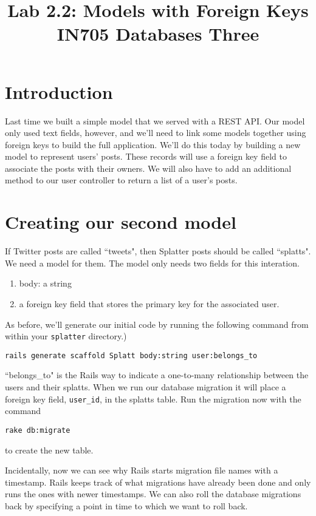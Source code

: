 \documentclass{article}
\begin{document}
\title{Lab 2.2: Models with Foreign Keys\\ IN705 Databases Three}
\date{}
\maketitle

\section*{Introduction}
Last time we built a simple model that we served with a REST API.  Our model only used text fields, however, and we'll need to link some models together using foreign keys to build the full application.  We'll do this today by building a new model to represent users' posts.  These records will use a foreign key field to associate the posts with their owners.  We will also have to add an additional method to our user controller to return a list of a user's posts.

\section{Creating our second model}
If Twitter posts are called ``tweets", then Splatter posts should be called ``splatts".  We need a model for them. The model only needs two fields for this interation.

\begin{enumerate}
  \item  body:  a string
  \item  a foreign key field that stores the primary key for the associated user.
\end{enumerate}  

 As before, we'll generate our initial code by running the following command from within your \texttt{splatter} directory.)

\texttt{rails generate scaffold Splatt body:string user:belongs\_to}

``belongs\_to" is the Rails way to indicate a one-to-many relationship between the users and their splatts.  When we run our database migration it will place a foreign key field, \texttt{user\_id}, in the splatts table. Run the migration now with the command

\texttt{rake db:migrate}

to create the new table.

Incidentally, now we can see why Rails starts migration file names with a timestamp.  Rails keeps track of what migrations have already been done and only runs the ones with newer timestamps.  We can also roll the database migrations back by specifying a point in time to which we want to roll back. 
\end{document}
